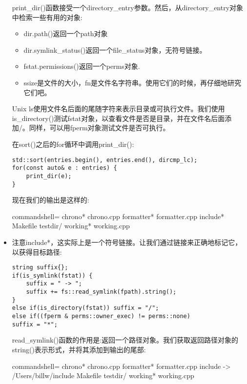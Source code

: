 \begin{itemize}
print\_dir()函数接受一个directory\_entry参数。然后，从directory\_entry对象中检索一些有用的对象:

\begin{itemize}
\item 
dir.path()返回一个path对象

\item 
dir.symlink\_status()返回一个file\_status对象，无符号链接。

\item 
fstat.permissions()返回一个perms对象.

\item 
ssize是文件的大小，fn是文件名字符串。使用它们的时候，再仔细地研究它们吧。
\end{itemize}

Unix ls使用文件名后面的尾随字符来表示目录或可执行文件。我们使用is\_directory()测试fstat对象，以查看文件是否是目录，并在文件名后面添加/。同样，可以用fperm对象测试文件是否可执行。

在sort()之后的for循环中调用print\_dir():

\begin{lstlisting}[style=styleCXX]
std::sort(entries.begin(), entries.end(), dircmp_lc);
for(const auto& e : entries) {
	print_dir(e);
}
\end{lstlisting}

现在我们的输出是这样的:

\begin{tcblisting}{commandshell={}}
chrono*
chrono.cpp
formatter*
formatter.cpp
include*
Makefile
testdir/
working*
working.cpp
\end{tcblisting}

\item 
注意include*，这实际上是一个符号链接。让我们通过链接来正确地标记它，以获得目标路径:

\begin{lstlisting}[style=styleCXX]
string suffix{};
if(is_symlink(fstat)) {
	suffix = " -> ";
	suffix += fs::read_symlink(fpath).string();
}
else if(is_directory(fstat)) suffix = "/";
else if((fperm & perms::owner_exec) != perms::none)
suffix = "*";
\end{lstlisting}

read\_symlink()函数的作用是:返回一个路径对象。我们获取返回路径对象的string()表示形式，并将其添加到输出的尾部:

\begin{tcblisting}{commandshell={}}
chrono*
chrono.cpp
formatter*
formatter.cpp
include -> /Users/billw/include
Makefile
testdir/
working*
working.cpp
\end{tcblisting}


\end{itemize}
